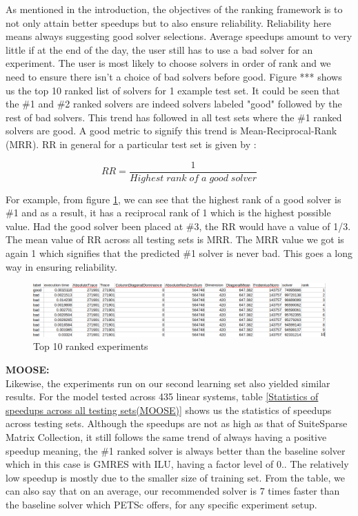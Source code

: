 As mentioned in the introduction, the objectives of the ranking framework is to not only attain better speedups but to also ensure reliability. Reliability here means always suggesting good solver selections. Average speedups amount to very little if at the end of the day, the user still has to use a bad solver for an experiment. The user is most likely to choose solvers in order of rank and we need to ensure there isn't a choice of bad solvers before good. Figure *** shows us the top 10 ranked list of solvers for 1 example test set. It could be seen that the \#1 and \#2 ranked solvers are indeed solvers labeled "good" followed by the rest of bad solvers. This trend has followed in all test sets where the \#1 ranked solvers are good. A good metric to signify this trend is Mean-Reciprocal-Rank (MRR). RR in general for a particular test set is given by : 

\[
RR=  \frac{1}{Highest\;rank\;of\;a\;good\;solver}
\]

 For example, from figure \ref{Top 10 ranked experiments}, we can see that the highest rank of a good solver is \#1 and as a result, it has a reciprocal rank of 1 which is the highest possible value. Had the good solver been placed at \#3, the RR would have a value of 1/3. The mean value of RR across all testing sets is MRR. The MRR value we got is again 1 which signifies that the predicted \#1 solver is never bad. This goes a long way in ensuring reliability.
 
 \begin{figure}
    \centering
    \includegraphics[width=1\columnwidth]{figures/rank_order.png}
    \caption{Top 10 ranked experiments}
    \label{Top 10 ranked experiments}
\end{figure}

\textbf{MOOSE:}\\
Likewise, the experiments run on our second learning set also yielded similar results. For the model tested across 435 linear systems, table \ref{Statistics of speedups across all testing sets(MOOSE)} shows us the statistics of speedups across testing sets. Although the speedups are not as high as that of SuiteSparse Matrix Collection, it still follows the same trend of always having a positive speedup meaning, the \#1 ranked solver is always better than the baseline solver which in this case is GMRES with ILU, having a factor level of 0.. The relatively low speedup is mostly due to the smaller size of training set. From the table, we can also say that on an average, our recommended solver is 7 times faster than the baseline solver which PETSc offers, for any specific experiment setup.



